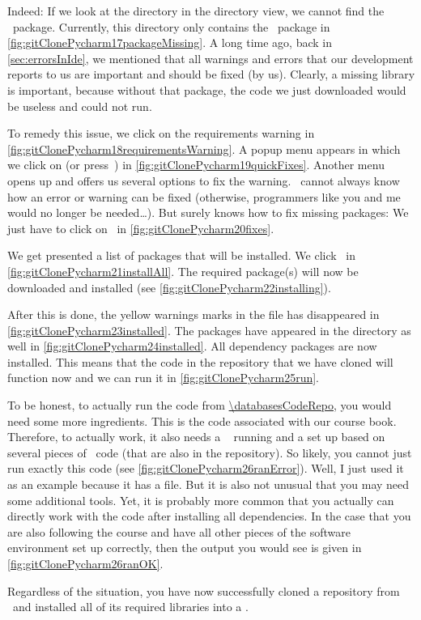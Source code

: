 Indeed: If we look at the  directory in the directory view, we cannot find the \psycopg\ package.
Currently, this directory only contains the \pip\ package in \cref{fig:gitClonePycharm17packageMissing}.
A long time ago, back in \cref{sec:errorsInIde}, we mentioned that all warnings and errors that our development  reports to us are important and should be fixed (by us).
Clearly, a missing library is important, because without that package, the code we just downloaded would be useless and could not run.

To remedy this issue, we click on the requirements warning in \cref{fig:gitClonePycharm18requirementsWarning}.
A popup menu appears in which we click on  (or press~\keys{\Alt+\return}) in \cref{fig:gitClonePycharm19quickFixes}.
Another menu opens up and offers us several options to fix the warning.
\pycharm\ cannot always know how an error or warning can be fixed (otherwise, programmers like you and me would no longer be needed\dots).
But surely knows how to fix missing packages:
We just have to click on~ in \cref{fig:gitClonePycharm20fixes}.

We get presented a list of packages that will be installed.
We click~ in \cref{fig:gitClonePycharm21installAll}.
The required package(s) will now be downloaded and installed (see \cref{fig:gitClonePycharm22installing}).

After this is done, the yellow warnings marks in the  file has disappeared in \cref{fig:gitClonePycharm23installed}.
The packages have appeared in the  directory as well in \cref{fig:gitClonePycharm24installed}.
All dependency packages are now installed.
This means that the code in the repository that we have cloned will function now and we can run it in \cref{fig:gitClonePycharm25run}.

To be honest, to actually run the code from \url{\databasesCodeRepo}, you would need some more ingredients.
This is the code associated with our  course book.
Therefore, to actually work, it also needs a \postgresql\  running and a  set up based on several pieces of \sql\ code (that are also in the repository).
So likely, you cannot just run exactly this code (see \cref{fig:gitClonePycharm26ranError}).
Well, I just used it as an example because it has a  file.
But it is also not unusual that you may need some additional tools.
Yet, it is probably more common that you actually can directly work with the code after installing all dependencies.
In the case that you are also following the  course and have all other pieces of the software environment set up correctly, then the output you would see is given in \cref{fig:gitClonePycharm26ranOK}.

Regardless of the situation, you have now successfully cloned a repository from \github\ and installed all of its required libraries into a .%
%
\FloatBarrier%
\endhsection%
